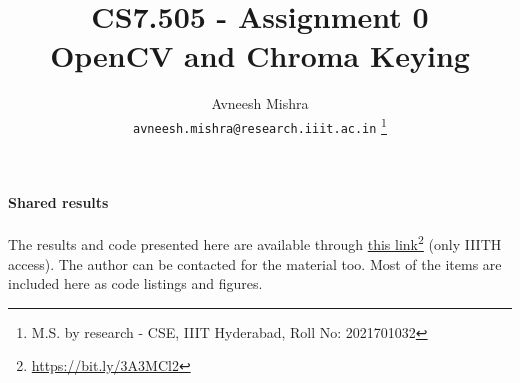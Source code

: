 

{
   \fancyhf{}
   \renewcommand{\headrulewidth}{0pt} %
}

\title{CS7.505 - Assignment 0 \\
    \Large OpenCV and Chroma Keying}

\author{
    Avneesh Mishra \\
    \texttt{avneesh.mishra@research.iiit.ac.in}
    \thanks{M.S. by research - CSE, IIIT Hyderabad, Roll No: 2021701032}
}


    \maketitle
    \thispagestyle{fancy_tr_rno}
    \tableofcontents
    \listoffigures
    \lstlistoflistings

    \paragraph{Shared results}
    The results and code presented here are available through \href{https://iiitaphyd-my.sharepoint.com/:f:/g/personal/avneesh_mishra_research_iiit_ac_in/EvF-gdLQc5VMhvc1izscJJEBSwqSCISDNdua8c60FN89xg?e=x9JUCJ}{this link}\footnote{\url{https://bit.ly/3A3MCl2}} (only IIITH access). The author can be contacted for the material too. Most of the items are included here as code listings and figures.
    
    \pagebreak
    
    \pagebreak
    
    \pagebreak
    
    \pagebreak
    \printbibliography

